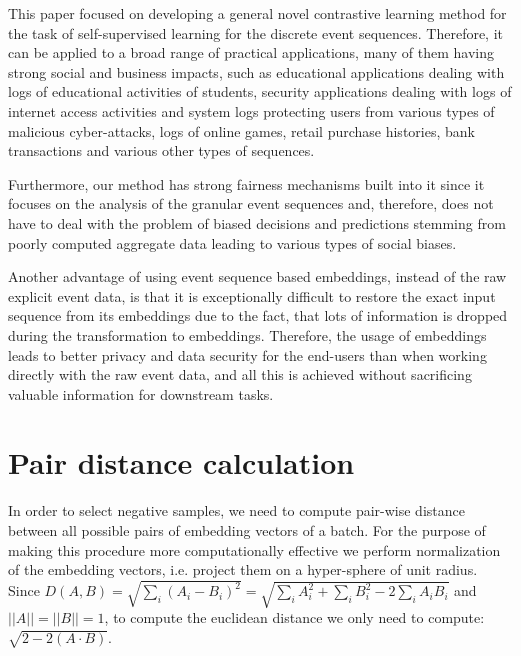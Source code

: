 \documentclass[sigconf, anonymous]{acmart}
\begin{document}
This paper focused on developing a general novel contrastive learning method for the task of self-supervised learning for the discrete event sequences. Therefore, it can be applied to a broad range of practical applications, many of them having strong social and business impacts, such as educational applications dealing with logs of educational activities of  students, security applications dealing with logs of internet access activities and system logs protecting users from various types of malicious cyber-attacks, logs of online games, retail purchase histories, bank transactions and various other types of sequences. 

Furthermore, our method has strong fairness mechanisms built into it since it focuses on the analysis of the granular event sequences and, therefore, does not have to deal with the problem of biased decisions and predictions stemming from poorly computed aggregate data leading to various types of social biases.

Another advantage of using event sequence based embeddings, instead of the raw explicit event data, is that it is exceptionally difficult to restore the exact input sequence from its embeddings due to the fact, that lots of information is dropped during the transformation to embeddings. Therefore, the usage of embeddings leads to better privacy and data security for the end-users than when working directly with the raw event data, and all this is achieved without sacrificing valuable information for downstream tasks.

\fi





\iffalse

\clearpage

\appendix

\section{Pair distance calculation} \label{app-sec-pair-dist}

In order to select negative samples, we need to compute pair-wise distance between all possible pairs of embedding vectors of a batch. For the purpose of making this procedure more computationally effective we perform normalization of the embedding vectors, i.e. project them on a hyper-sphere of unit radius. Since $D(A,B) = \sqrt{\sum_i(A_i - B_i)^2} = \sqrt{\sum_i A_i^2 + \sum_i B_i^2 - 2\sum_i A_i B_i} $ and $||A||= ||B||=1$, to compute the euclidean distance we only need to compute: $\sqrt{2 - 2(A \cdot B)}$.
\end{document}
